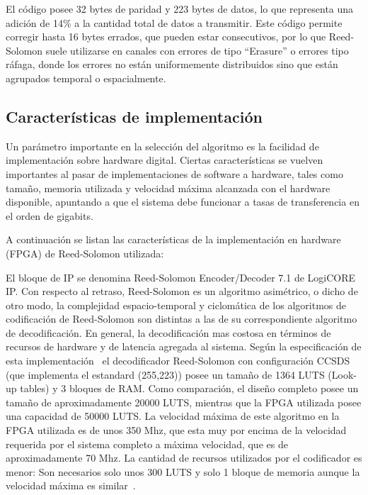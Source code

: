 El código posee 32 bytes de paridad y 223 bytes de datos, lo que representa una adición de 14\% a la cantidad total de datos a transmitir. Este código permite corregir hasta 16 bytes errados, que pueden estar consecutivos, por lo que Reed-Solomon suele utilizarse en canales con errores de tipo ``Erasure'' o errores tipo ráfaga, donde los errores no están uniformemente distribuidos sino que están agrupados temporal o espacialmente.


\subsection{Características de implementación}
Un parámetro importante en la selección del algoritmo es la facilidad de implementación sobre hardware digital. Ciertas características se vuelven importantes al pasar de implementaciones de software a hardware, tales como tamaño, memoria utilizada y velocidad máxima alcanzada con el hardware disponible, apuntando a que el sistema debe funcionar a tasas de transferencia en el orden de gigabits.

A continuación se listan las características de la implementación en hardware (FPGA) de Reed-Solomon utilizada:

El bloque de IP se denomina Reed-Solomon Encoder/Decoder 7.1 de LogiCORE IP. Con respecto al retraso, Reed-Solomon es un algoritmo asimétrico, o dicho de otro modo, la complejidad espacio-temporal y ciclomática de los algoritmos de codificación de Reed-Solomon son distintas a las de su correspondiente algoritmo de decodificación. En general, la decodificación mas costosa en términos de recursos de hardware y de latencia agregada al sistema. Según la especificación de esta implementación~\cite{Xilinx:DS252} el decodificador Reed-Solomon con configuración CCSDS \cite{coding1999consultative} (que implementa el estandard (255,223)) posee un tamaño de 1364 LUTS (Look-up tables) y 3 bloques de RAM. Como comparación, el diseño completo posee un tamaño de aproximadamente 20000 LUTS, mientras que la FPGA utilizada posee una capacidad de 50000 LUTS. La velocidad máxima de este algoritmo en la FPGA utilizada es de unos 350 Mhz, que esta muy por encima de la velocidad requerida por el sistema completo a máxima velocidad, que es de aproximadamente 70 Mhz.
La cantidad de recursos utilizados por el codificador es menor: Son necesarios solo unos 300 LUTS y solo 1 bloque de memoria aunque la velocidad máxima es similar~\cite{Xilinx:DS251}.

